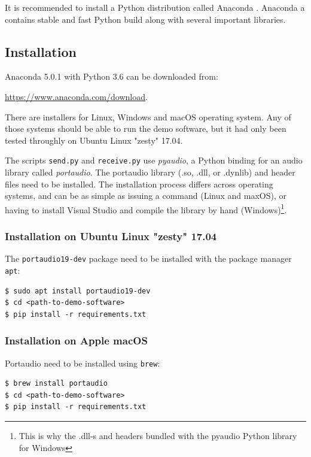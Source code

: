 \documentclass[a4paper]{article}
\begin{document}
It is recommended to install a Python distribution called Anaconda
\cite{ana1}. Anaconda a contains stable and fast Python build along
with several important libraries.

\subsection{Installation}

Anaconda 5.0.1 with Python 3.6 can be downloaded from:

\url{https://www.anaconda.com/download}.

There are installers for Linux, Windows and macOS operating system. Any 
of those systems should be able to run the demo software, but it had 
only been tested throughly on Ubuntu Linux "zesty" 17.04.

The scripts \texttt{send.py} and \texttt{receive.py} use 
\textit{pyaudio}, a Python binding for an audio library called 
\textit{portaudio}. The portaudio library (.so, .dll, or .dynlib) and 
header files need to be installed. The installation process differs 
across operating systems, and can be as simple as issuing a command 
(Linux and maxOS), or having to install Visual Studio and compile the 
library by hand (Windows)\footnote{This is why the .dll-s and headers 
bundled with the pyaudio Python library for Windows}.

\subsubsection{Installation on Ubuntu Linux "zesty" 17.04}

The \texttt{portaudio19-dev} package need to be installed with the 
package manager \texttt{apt}:

\begin{lstlisting}
$ sudo apt install portaudio19-dev
$ cd <path-to-demo-software>
$ pip install -r requirements.txt
\end{lstlisting}

\subsubsection{Installation on Apple macOS}

Portaudio need to be installed using \texttt{brew}:

\begin{lstlisting}
$ brew install portaudio
$ cd <path-to-demo-software>
$ pip install -r requirements.txt
\end{lstlisting}
\end{document}
